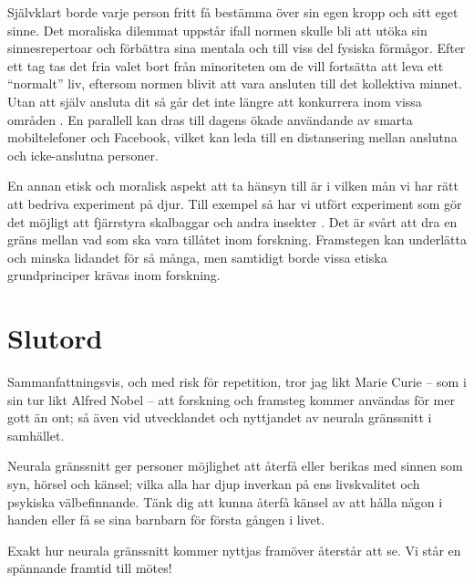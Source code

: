 \documentclass[12pt, a4paper]{article}
\begin{document}
Självklart borde varje person fritt få bestämma över sin egen kropp och sitt eget sinne. Det moraliska dilemmat uppstår ifall normen skulle bli att utöka sin sinnesrepertoar och förbättra sina mentala och till viss del fysiska förmågor. Efter ett tag tas det fria valet bort från minoriteten om de vill fortsätta att leva ett ``normalt'' liv, eftersom normen blivit att vara ansluten till det kollektiva minnet. Utan att själv ansluta dit så går det inte längre att konkurrera inom vissa områden \cite{ethics_eu,ethics1}. En parallell kan dras till dagens ökade användande av smarta mobiltelefoner och Facebook, vilket kan leda till en distansering mellan anslutna och icke-anslutna personer.

En annan etisk och moralisk aspekt att ta hänsyn till är i vilken mån vi har rätt att bedriva experiment på djur. Till exempel så har vi utfört experiment som gör det möjligt att fjärrstyra skalbaggar och andra insekter \cite{ethics2}. Det är svårt att dra en gräns mellan vad som ska vara tillåtet inom forskning. Framstegen kan underlätta och minska lidandet för så många, men samtidigt borde vissa etiska grundprinciper krävas inom forskning.

\section{Slutord}

Sammanfattningsvis, och med risk för repetition, tror jag likt Marie Curie -- som i sin tur likt Alfred Nobel -- att forskning och framsteg kommer användas för mer gott än ont; så även vid utvecklandet och nyttjandet av neurala gränssnitt i samhället.

Neurala gränssnitt ger personer möjlighet att återfå eller berikas med sinnen som syn, hörsel och känsel; vilka alla har djup inverkan på ens livskvalitet och psykiska välbefinnande. Tänk dig att kunna återfå känsel av att hålla någon i handen eller få se sina barnbarn för första gången i livet.

Exakt hur neurala gränssnitt kommer nyttjas framöver återstår att se. Vi står en spännande framtid till mötes!






%
%




\pagebreak


\end{document}
